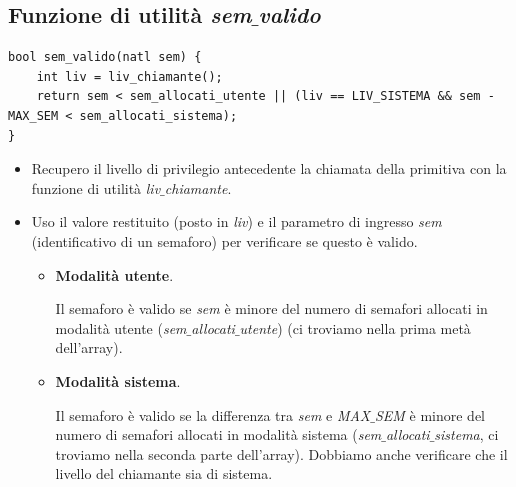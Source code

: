 \documentclass[11pt]{report}
\theoremstyle{definition}
\begin{document}
\subsection{Funzione di utilità \emph{sem$\_$valido}} 
\small
\begin{verbatim}
bool sem_valido(natl sem) {
    int liv = liv_chiamante();
    return sem < sem_allocati_utente || (liv == LIV_SISTEMA && sem - MAX_SEM < sem_allocati_sistema);
}
\end{verbatim}
\normalsize
\begin{itemize}
	\item Recupero il livello  di privilegio antecedente la chiamata della primitiva con la funzione di utilità \emph{liv$\_$chiamante}.
	\item Uso il valore restituito (posto in \emph{liv}) e il parametro di ingresso \emph{sem} (identificativo di un semaforo) per verificare se questo è valido.
	\begin{itemize}
		\item \textbf{Modalità utente}.
		
		Il semaforo è valido se \emph{sem} è minore del numero di semafori allocati in modalità utente (\emph{sem$\_$allocati$\_$utente}) (ci troviamo nella prima metà dell'array).
		\item \textbf{Modalità sistema}. 
		
		Il semaforo è valido se la differenza tra \emph{sem} e \emph{MAX$\_$SEM} è minore del numero di semafori allocati in modalità sistema (\emph{sem$\_$allocati$\_$sistema}, ci troviamo nella seconda parte dell'array). Dobbiamo anche verificare che il livello del chiamante sia di sistema.  
	\end{itemize}
\end{itemize}
\end{document}

